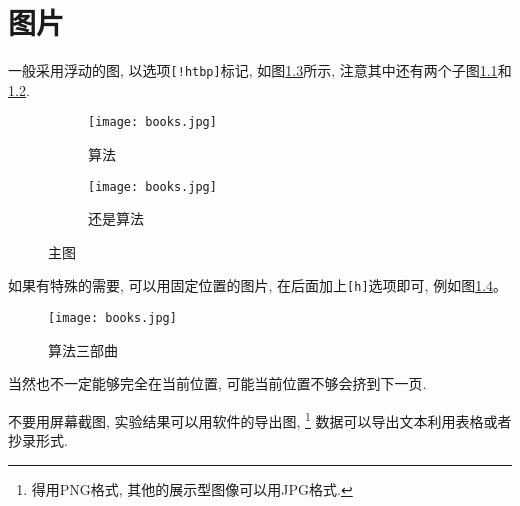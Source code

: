 \chapter{图片}

  一般采用浮动的图, 以选项\texttt{[!htbp]}标记, 如图\ref{fig:algorithm}所示,
注意其中还有两个子图\ref{fig:algorithm:a}和\ref{fig:algorithm:b}.

\begin{figure}[!htbp]
\centering
\begin{subfigure}[t]{.3\textwidth}
  \centering
  \texttt{[image: books.jpg]}
  \caption{算法}
  \label{fig:algorithm:a}
\end{subfigure}
\quad
\begin{subfigure}[t]{.3\textwidth}
  \centering
  \texttt{[image: books.jpg]}
  \caption{还是算法}
  \label{fig:algorithm:b}
\end{subfigure}
\caption{主图}
\label{fig:algorithm}
\end{figure}


  如果有特殊的需要, 可以用固定位置的图片, 在后面加上\texttt{[h]}选项即可, 例如图\ref{fig:books}。

\begin{figure}[h]
    \centering
    \texttt{[image: books.jpg]}
    \caption{算法三部曲}
    \label{fig:books}
\end{figure}

  当然也不一定能够完全在当前位置, 可能当前位置不够会挤到下一页.

  不要用屏幕截图, 实验结果可以用软件的导出图,%
\footnote{得用PNG格式, 其他的展示型图像可以用JPG格式.}
数据可以导出文本利用表格或者抄录形式.
